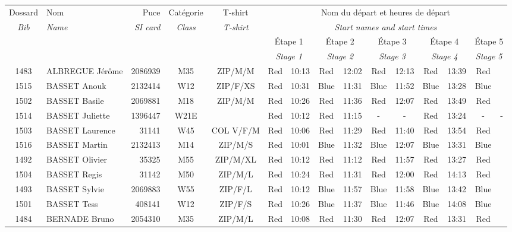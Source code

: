 \documentclass{report}
\begin{document}
  \begin{longtable}{|c|l|r|c|c|*{5}{cc|}}
    Dossard & Nom  & Puce    & Catégorie & T-shirt & \multicolumn{10}{c|}{Nom du départ et heures de départ} \\
    \itshape Bib     & \itshape Name & \itshape SI card & \itshape Class  & \itshape  T-shirt  & \multicolumn{10}{c|}{\itshape Start names and start times} \\
    \hline
    & & & & & \multicolumn{2}{c|}{Étape 1} & \multicolumn{2}{c|}{Étape 2} & \multicolumn{2}{c|}{Étape 3} & \multicolumn{2}{c|}{Étape 4} & \multicolumn{2}{c|}{Étape 5} \\
    & & & & & \multicolumn{2}{c|}{\itshape Stage 1} & \multicolumn{2}{c|}{\itshape Stage 2} & \multicolumn{2}{c|}{\itshape Stage 3} & \multicolumn{2}{c|}{\itshape Stage 4} & \multicolumn{2}{c|}{\itshape Stage 5} \\
    \hline
    1483 & ALBREGUE Jérôme & 2086939 & M35 & ZIP/M/M & Red & 10:13 & Red & 12:02 & Red & 12:13 & Red & 13:39 & Red &  \\
    1515 & BASSET Anouk & 2132414 & W12 & ZIP/F/XS & Red & 10:31 & Blue & 11:31 & Blue & 11:52 & Blue & 13:28 & Blue &  \\
    1502 & BASSET Basile & 2069881 & M18 & ZIP/M/M & Red & 10:26 & Red & 11:36 & Red & 12:07 & Red & 13:49 & Red &  \\
    1514 & BASSET Juliette & 1396447 & W21E &   & Red & 10:12 & Red & 11:15 & - &  - & Red & 13:24 & - &  -\\
    1503 & BASSET Laurence & 31141 & W45 & COL V/F/M & Red & 10:06 & Red & 11:29 & Red & 11:40 & Red & 13:54 & Red &  \\
    1516 & BASSET Martin & 2132413 & M14 & ZIP/M/S & Red & 10:01 & Blue & 11:32 & Blue & 12:07 & Blue & 13:31 & Blue &  \\
    1492 & BASSET Olivier & 35325 & M55 & ZIP/M/XL & Red & 10:12 & Red & 11:12 & Red & 11:57 & Red & 13:27 & Red &  \\
    1504 & BASSET Regis & 31142 & M50 & ZIP/M/L & Red & 10:24 & Red & 11:31 & Red & 12:00 & Red & 14:13 & Red &  \\
    1493 & BASSET Sylvie & 2069883 & W55 & ZIP/F/L & Red & 10:12 & Blue & 11:57 & Blue & 11:58 & Blue & 13:42 & Blue &  \\
    1501 & BASSET Tess & 408141 & W12 & ZIP/F/S & Red & 10:26 & Blue & 11:37 & Blue & 11:46 & Blue & 14:08 & Blue &  \\
    1484 & BERNADE Bruno & 2054310 & M35 & ZIP/M/L & Red & 10:08 & Red & 11:30 & Red & 12:07 & Red & 13:31 & Red &  \\

\end{longtable}
\end{document}
